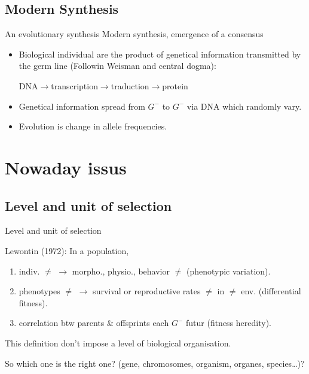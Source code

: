 \documentclass[8pt]{beamer}
\begin{document}
\subsection{Modern Synthesis}
\begin{frame}{An evolutionary synthesis}
	Modern synthesis, emergence of a consensus
	\begin{itemize}

		\item	Biological individual are the product of genetical information transmitted by the germ line (Followin Weisman and central dogma):

			\begin{center}
				DNA$\rightarrow$transcription$\rightarrow$traduction$\rightarrow$protein
			\end{center}

		\item Genetical information spread from $G^-$ to $G^-$ via DNA which randomly vary.

	\item Evolution is change in allele frequencies. 

	\end{itemize}


\end{frame}


\section{Nowaday issus}
\subsection{Level and unit of selection}
\begin{frame}{Level and unit of selection}

	Lewontin (1972):
	\vfill
	In a population,
	\begin{enumerate}
		\item indiv. $\ne$ $\rightarrow$ morpho., physio., behavior $\ne$ (\alert{phenotypic variation}).
		\item phenotypes $\ne$ $\rightarrow$ survival or reproductive rates $\ne$ in $\ne$ env. (\alert{differential fitness}).
		\item correlation btw parents \& offsprints each $G^-$ futur (\alert{fitness heredity}).
	\end{enumerate}
	\vfill

	This definition don't impose a level of biological organisation. 
	
	So which one is the right one? (gene, chromosomes, organism, organes, species\ldots)?
\end{frame}
\end{document}
